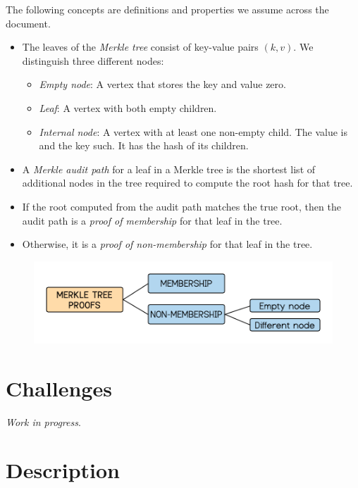 \documentclass{article}
\begin{document}
\begin{spacing}{1.2}
The following concepts are definitions and properties we assume across the document.

\begin{itemize}
	\item The leaves of the {\it Merkle tree} consist of key-value pairs $(k,v)$. We distinguish three different nodes:
	\begin{itemize}
		\item {\it Empty node}: A vertex that stores the key and value zero.
		\item {\it Leaf}: A vertex with both empty children. %
		\item {\it Internal node}: A vertex with at least one non-empty child. The value is and the key such. It has the hash of its children. %
	\end{itemize}
	\item A {\it Merkle audit path} for a leaf in a Merkle tree is the shortest list of additional nodes in the tree required to compute the root hash for that tree.
	\item If the root computed from the audit path matches the true root, then the audit path is a  {\it proof of membership} for that leaf in the tree.
	\item Otherwise, it is a {\it proof of non-membership} for that leaf in the tree. 
\end{itemize}

\begin{figure}[h]
	\centering
	\includegraphics[scale=0.6]{../../figures/MT-pfs-h.png} 
\end{figure}

\section{Challenges}

{\it Work in progress}.

\section{Description}			


\end{spacing}
\end{document}
